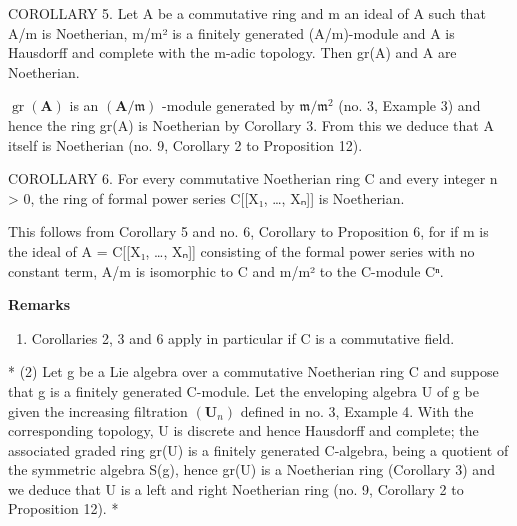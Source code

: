 COROLLARY 5. Let A be a commutative ring and m an ideal of A such that A/m is Noetherian, m/m² is a finitely generated (A/m)-module and A is Hausdorff and complete with the m-adic topology. Then gr(A) and A are Noetherian.

\(\operatorname{gr}(\mathbf{A})\) is an \((\mathbf{A} / \mathfrak{m})\) -module generated by \(\mathfrak{m} / \mathfrak{m}^2\) (no. 3, Example 3) and hence the ring gr(A) is Noetherian by Corollary 3. From this we deduce that A itself is Noetherian (no. 9, Corollary 2 to Proposition 12).

COROLLARY 6. For every commutative Noetherian ring C and every integer n \textgreater{} 0, the ring of formal power series C{[}{[}X₁, \ldots, Xₙ{]}{]} is Noetherian.

This follows from Corollary 5 and no. 6, Corollary to Proposition 6, for if m is the ideal of A = C{[}{[}X₁, \ldots, Xₙ{]}{]} consisting of the formal power series with no constant term, A/m is isomorphic to C and m/m² to the C-module Cⁿ.

\textbf{Remarks}\par

\begin{enumerate}
\def\labelenumi{(\arabic{enumi})}
\tightlist
\item
  Corollaries 2, 3 and 6 apply in particular if C is a commutative field.
\end{enumerate}

* (2) Let g be a Lie algebra over a commutative Noetherian ring C and suppose that g is a finitely generated C-module. Let the enveloping algebra U of g be given the increasing filtration \((\mathbf{U}_{n})\) defined in no. 3, Example 4. With the corresponding topology, U is discrete and hence Hausdorff and complete; the associated graded ring gr(U) is a finitely generated C-algebra, being a quotient of the symmetric algebra S(g), hence gr(U) is a Noetherian ring (Corollary 3) and we deduce that U is a left and right Noetherian ring (no. 9, Corollary 2 to Proposition 12). *

